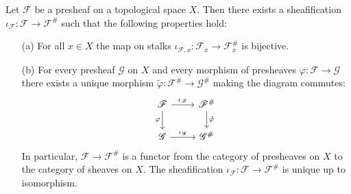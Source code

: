 \begin{proposition}\label{sheaf sheafification construction}
Let $\mathscr{F}$ be a presheaf on a topological space $X$. Then there exists a sheafification $\iota_{\mathscr{F}}:\mathscr{F}\to\mathscr{F}^{\#}$ such that the following properties hold:
\begin{itemize}
\item[(a)] For all $x\in X$ the map on stalks $\iota_{\mathscr{F},x}:\mathscr{F}_x\to\mathscr{F}^{\#}_x$ is bijective.
\item[(b)] For every presheaf $\mathscr{G}$ on $X$ and every morphism of presheaves $\varphi:\mathscr{F}\to\mathscr{G}$ there exists
a unique morphism $\tilde{\varphi}:\mathscr{F}^{\#}\to\mathscr{G}^{\#}$ making the diagram commutes:
\begin{equation}\label{sheafification-1}
\begin{tikzcd}
\mathscr{F}\ar[r,"\iota_{\mathscr{F}}"]\ar[d,swap,"\varphi"]&\mathscr{F}^{\#}\ar[d,"\tilde{\varphi}"]\\
\mathscr{G}\ar[r,"\iota_{\mathscr{G}}"]&\mathscr{G}^{\#}
\end{tikzcd}
\end{equation}
In particular, $\mathscr{F}\to\mathscr{F}^{\#}$ is a functor from the category of presheaves on $X$ to the category of sheaves on $X$. The sheafification $\iota_{\mathscr{F}}:\mathscr{F}\to\mathscr{F}^{\#}$ is unique up to isomorphism. 
\end{itemize}
\end{proposition}
